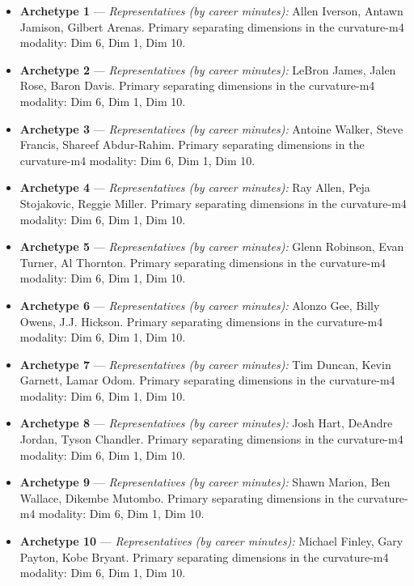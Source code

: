 \begin{itemize}
\item \textbf{Archetype 1} --- \emph{Representatives (by career minutes):} Allen Iverson, Antawn Jamison, Gilbert Arenas. Primary separating dimensions in the curvature-m4 modality: Dim 6, Dim 1, Dim 10.
\item \textbf{Archetype 2} --- \emph{Representatives (by career minutes):} LeBron James, Jalen Rose, Baron Davis. Primary separating dimensions in the curvature-m4 modality: Dim 6, Dim 1, Dim 10.
\item \textbf{Archetype 3} --- \emph{Representatives (by career minutes):} Antoine Walker, Steve Francis, Shareef Abdur-Rahim. Primary separating dimensions in the curvature-m4 modality: Dim 6, Dim 1, Dim 10.
\item \textbf{Archetype 4} --- \emph{Representatives (by career minutes):} Ray Allen, Peja Stojakovic, Reggie Miller. Primary separating dimensions in the curvature-m4 modality: Dim 6, Dim 1, Dim 10.
\item \textbf{Archetype 5} --- \emph{Representatives (by career minutes):} Glenn Robinson, Evan Turner, Al Thornton. Primary separating dimensions in the curvature-m4 modality: Dim 6, Dim 1, Dim 10.
\item \textbf{Archetype 6} --- \emph{Representatives (by career minutes):} Alonzo Gee, Billy Owens, J.J. Hickson. Primary separating dimensions in the curvature-m4 modality: Dim 6, Dim 1, Dim 10.
\item \textbf{Archetype 7} --- \emph{Representatives (by career minutes):} Tim Duncan, Kevin Garnett, Lamar Odom. Primary separating dimensions in the curvature-m4 modality: Dim 6, Dim 1, Dim 10.
\item \textbf{Archetype 8} --- \emph{Representatives (by career minutes):} Josh Hart, DeAndre Jordan, Tyson Chandler. Primary separating dimensions in the curvature-m4 modality: Dim 6, Dim 1, Dim 10.
\item \textbf{Archetype 9} --- \emph{Representatives (by career minutes):} Shawn Marion, Ben Wallace, Dikembe Mutombo. Primary separating dimensions in the curvature-m4 modality: Dim 6, Dim 1, Dim 10.
\item \textbf{Archetype 10} --- \emph{Representatives (by career minutes):} Michael Finley, Gary Payton, Kobe Bryant. Primary separating dimensions in the curvature-m4 modality: Dim 6, Dim 1, Dim 10.
\end{itemize}
